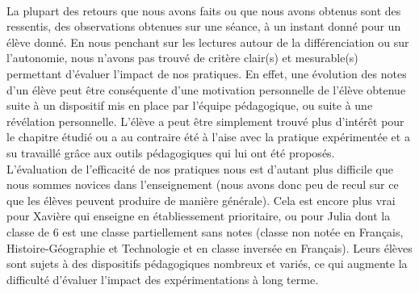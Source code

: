\paragraph*{} La plupart des retours que nous avons faits ou que nous avons obtenus sont des ressentis, des observations obtenues sur une séance, à un instant donné pour un élève donné. En nous penchant sur les lectures autour de la différenciation ou sur l'autonomie, nous n'avons pas trouvé de critère clair(s) et mesurable(s) permettant d'évaluer l'impact de nos pratiques. En effet, une évolution des notes d'un élève peut être conséquente d'une motivation personnelle de l'élève obtenue suite à un dispositif mis en place par l'équipe pédagogique, ou suite à une révélation personnelle. L'élève a peut être simplement trouvé plus d'intérêt pour le chapitre étudié ou a au contraire été à l'aise avec la pratique expérimentée et a su travaillé grâce aux outils pédagogiques qui lui ont été proposés.\\
L'évaluation de l'efficacité de nos pratiques nous est d'autant plus difficile que nous sommes novices dans l'enseignement (nous avons donc peu de recul sur ce que les élèves peuvent produire de manière générale). Cela est encore plus vrai pour Xavière qui enseigne en établiessement prioritaire, ou pour Julia dont la classe de 6 est une classe partiellement sans notes (classe non notée en Français, Histoire-Géographie et Technologie et en classe inversée en Français). Leurs élèves sont sujets à des dispositifs pédagogiques nombreux et variés, ce qui augmente la difficulté d'évaluer l'impact des expérimentations à long terme.

